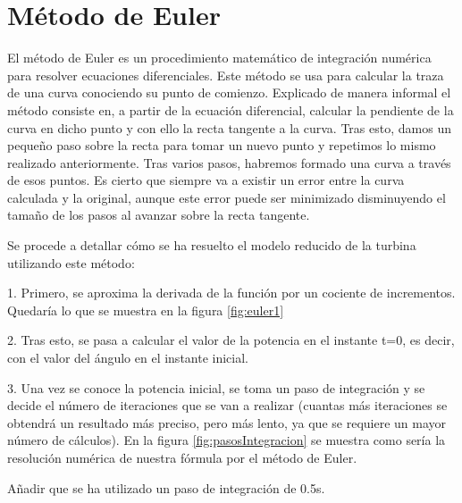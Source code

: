 \label{fig:coeficientePotencia}


\section{Método de Euler}

El método de Euler es un procedimiento matemático de integración numérica para resolver ecuaciones diferenciales. Este método se usa para calcular la traza de una curva conociendo su punto de comienzo.
Explicado de manera informal el método consiste en, a partir de la ecuación diferencial, calcular la pendiente de la curva en dicho punto y con ello la recta tangente a la curva. Tras esto, damos un pequeño paso sobre la recta para tomar un nuevo punto y repetimos lo mismo realizado anteriormente.
Tras varios pasos, habremos formado una curva a través de esos puntos. Es cierto que siempre va a existir un error entre la curva calculada y la original, aunque este error puede ser minimizado disminuyendo el tamaño de los pasos al avanzar sobre la recta tangente.

Se procede a detallar cómo se ha resuelto el modelo reducido de la turbina utilizando este método:

    1. Primero, se aproxima la derivada de la función por un cociente de incrementos. Quedaría lo que se muestra en la figura \ref{fig:euler1}

    \label{fig:euler1}

    2. Tras esto, se pasa a calcular el valor de la potencia en el instante t=0, es decir, con el valor del ángulo en el instante inicial.
    
    3. Una vez se conoce la potencia inicial, se toma un paso de integración y se decide el número de iteraciones que se van a realizar (cuantas más iteraciones se obtendrá un resultado más preciso, pero más lento, ya que se requiere un mayor número de cálculos). En la figura \ref{fig:pasosIntegracion} se muestra como sería la resolución numérica de nuestra fórmula por el método de Euler. 
    
    \label{fig:pasosIntegracion}
    
    Añadir que se ha utilizado un paso de integración de 0.5s.

